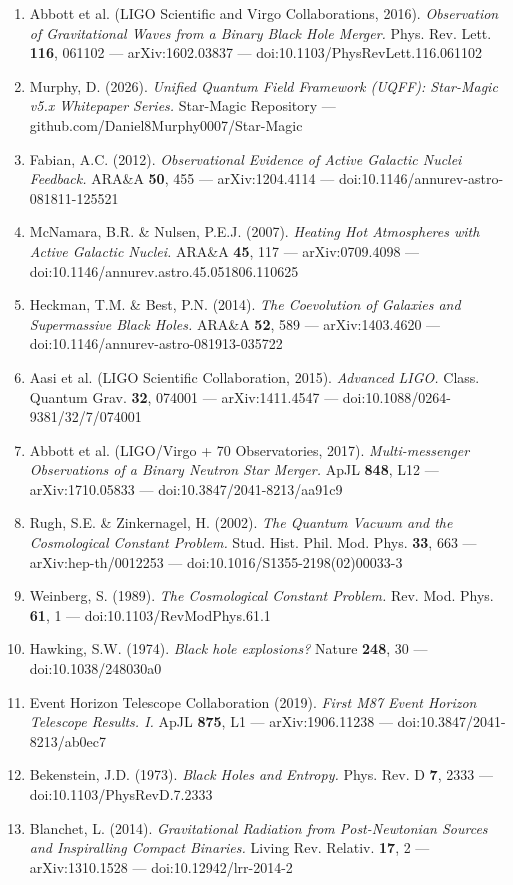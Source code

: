 \documentclass[12pt,a4paper]{article}
\begin{document}
\begin{enumerate}
  \item Abbott et al. (LIGO Scientific and Virgo Collaborations, 2016). \emph{Observation of Gravitational Waves from a Binary Black Hole Merger.} Phys. Rev. Lett. \textbf{116}, 061102 --- arXiv:1602.03837 --- doi:10.1103/PhysRevLett.116.061102
  \item Murphy, D. (2026). \emph{Unified Quantum Field Framework (UQFF): Star-Magic v5.x Whitepaper Series.} Star-Magic Repository --- github.com/Daniel8Murphy0007/Star-Magic
  \item Fabian, A.C. (2012). \emph{Observational Evidence of Active Galactic Nuclei Feedback.} ARA\&A \textbf{50}, 455 --- arXiv:1204.4114 --- doi:10.1146/annurev-astro-081811-125521
  \item McNamara, B.R. \& Nulsen, P.E.J. (2007). \emph{Heating Hot Atmospheres with Active Galactic Nuclei.} ARA\&A \textbf{45}, 117 --- arXiv:0709.4098 --- doi:10.1146/annurev.astro.45.051806.110625
  \item Heckman, T.M. \& Best, P.N. (2014). \emph{The Coevolution of Galaxies and Supermassive Black Holes.} ARA\&A \textbf{52}, 589 --- arXiv:1403.4620 --- doi:10.1146/annurev-astro-081913-035722
  \item Aasi et al. (LIGO Scientific Collaboration, 2015). \emph{Advanced LIGO.} Class. Quantum Grav. \textbf{32}, 074001 --- arXiv:1411.4547 --- doi:10.1088/0264-9381/32/7/074001
  \item Abbott et al. (LIGO/Virgo + 70 Observatories, 2017). \emph{Multi-messenger Observations of a Binary Neutron Star Merger.} ApJL \textbf{848}, L12 --- arXiv:1710.05833 --- doi:10.3847/2041-8213/aa91c9
  \item Rugh, S.E. \& Zinkernagel, H. (2002). \emph{The Quantum Vacuum and the Cosmological Constant Problem.} Stud. Hist. Phil. Mod. Phys. \textbf{33}, 663 --- arXiv:hep-th/0012253 --- doi:10.1016/S1355-2198(02)00033-3
  \item Weinberg, S. (1989). \emph{The Cosmological Constant Problem.} Rev. Mod. Phys. \textbf{61}, 1 --- doi:10.1103/RevModPhys.61.1
  \item Hawking, S.W. (1974). \emph{Black hole explosions?} Nature \textbf{248}, 30 --- doi:10.1038/248030a0
  \item Event Horizon Telescope Collaboration (2019). \emph{First M87 Event Horizon Telescope Results. I.} ApJL \textbf{875}, L1 --- arXiv:1906.11238 --- doi:10.3847/2041-8213/ab0ec7
  \item Bekenstein, J.D. (1973). \emph{Black Holes and Entropy.} Phys. Rev. D \textbf{7}, 2333 --- doi:10.1103/PhysRevD.7.2333
  \item Blanchet, L. (2014). \emph{Gravitational Radiation from Post-Newtonian Sources and Inspiralling Compact Binaries.} Living Rev. Relativ. \textbf{17}, 2 --- arXiv:1310.1528 --- doi:10.12942/lrr-2014-2
\end{enumerate}
\end{document}

